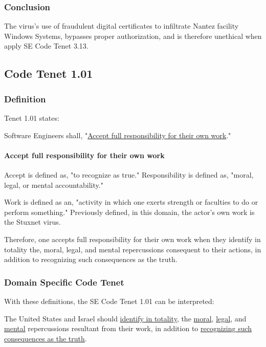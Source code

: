 \documentclass[12pt]{article}
\begin{document}
\begin{multicols}{2}
\subsubsection{Conclusion}

The virus’s use of fraudulent digital certificates to infiltrate Nantez facility Windows Systems, bypasses proper authorization, and is therefore unethical when apply SE Code Tenet 3.13.

\subsection{Code Tenet 1.01}

\subsubsection{Definition}

Tenet 1.01 states:
\begin{framed}
Software Engineers shall, "\ul{Accept full responsibility for their own work}."\cite{softwareEngineeringCodeOfEthics}
\end{framed}

\paragraph{Accept full responsibility for their own work}

Accept is defined as, "to recognize as true."\cite{merriamWebsterDefinitions} Responsibility is defined as, "moral, legal, or mental accountability."\cite{merriamWebsterDefinitions}

Work is defined as an, "activity in which one exerts strength or faculties to do or perform something."\cite{cambridgeDictionary} Previously defined, in this domain, the actor's own work is the Stuxnet virus.

Therefore, one accepts full responsibility for their own work when they identify in totality  the, moral, legal, and mental repercussions consequent to their actions, in addition to recognizing such consequences as the truth.\cite{cambridgeDictionary}

\subsubsection{Domain Specific Code Tenet}

With these definitions, the SE Code Tenet 1.01 can be interpreted:
\begin{framed}
The United States and Israel should \ul{identify in totality}, the \ul{moral}, \ul{legal}, and \ul{mental} repercussions resultant from their work, in addition to \ul{recognizing such consequences as the truth}.
\end{framed}


\end{multicols}
\end{document}
